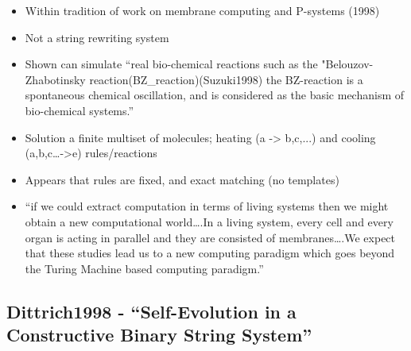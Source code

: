 \begin{itemize}
\begin{itemize}
			\end{itemize}
			\item
			
			Within tradition of work on membrane computing and P-systems (1998)
			
			\item
			
			Not a string rewriting system
			
			\item
			
			Shown can simulate ``real bio-chemical reactions such as the
			"Belouzov- Zhabotinsky reaction(BZ\_reaction)(Suzuki1998) the
			BZ-reaction is a spontaneous chemical oscillation, and is considered
			as the basic mechanism of bio-chemical systems.''
			
			\item
			
			Solution a finite multiset of molecules; heating (a -\textgreater{}
			b,c,...) and cooling (a,b,c\ldots{}-\textgreater{}e) rules/reactions
			
			\item
			
			Appears that rules are fixed, and exact matching (no templates)
			
			\item
			
			``if we could extract computation in terms of living systems then we
			might obtain a new computational world\ldots{}.In a living system,
			every cell and every organ is acting in parallel and they are
			consisted of membranes\ldots{}.We expect that these studies lead us to
			a new computing paradigm which goes beyond the Turing Machine based
			computing paradigm.''
			
		\end{itemize}
		
		\hypertarget{dittrich1998---self-evolution-in-a-constructive-binary-string-system}{\subsection{Dittrich1998
				- ``Self-Evolution in a Constructive Binary String
				System''}\label{dittrich1998---self-evolution-in-a-constructive-binary-string-system}}
		
